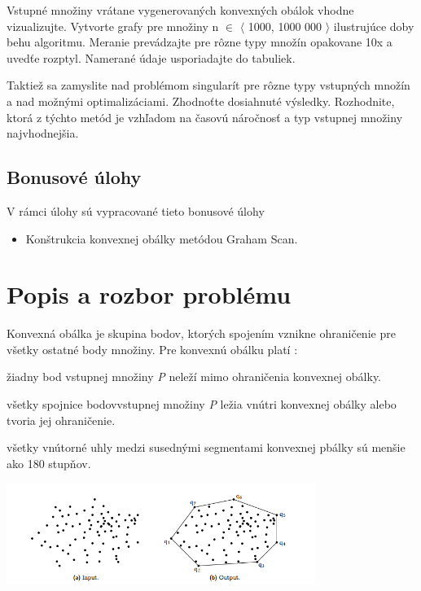 \documentclass[12pt]{article}
\begin{document}
Vstupné množiny vrátane vygenerovaných konvexných obálok vhodne vizualizujte. Vytvorte grafy pre množiny n $\in$ $\langle$ 1000, 1000 000 $\rangle$ ilustrujúce doby behu algoritmu. Meranie prevádzajte pre rôzne typy množín opakovane 10x a uvedťe rozptyl. Namerané údaje usporiadajte do tabuliek.

Taktiež sa zamyslite nad problémom singularít pre rôzne typy vstupných množín a nad možnými optimalizáciami. Zhodnoťte dosiahnuté výsledky. Rozhodnite, ktorá z týchto metód je vzhľadom na časovú náročnosť a typ vstupnej množiny najvhodnejšia.

\subsection{Bonusové úlohy}
V rámci úlohy sú vypracované tieto bonusové úlohy

\begin{itemize}
\item Konštrukcia konvexnej obálky metódou Graham Scan.
\end{itemize}

\section{Popis a rozbor problému}
Konvexná obálka je skupina bodov, ktorých spojením vznikne ohraničenie pre všetky ostatné body množiny. Pre konvexnú obálku platí : 

\item žiadny bod vstupnej množiny \textit{P} neleží mimo ohraničenia konvexnej obálky.
\item všetky spojnice bodovvstupnej množiny \textit{P} ležia vnútri konvexnej obálky alebo tvoria jej ohraničenie.
\item všetky vnútorné uhly medzi susednými segmentami konvexnej pbálky sú menšie ako 180 stupňov.

\begin{center}
   \includegraphics[width=10cm]{./img/ch_obrazok1.png}
\end{center}
\end{document}
